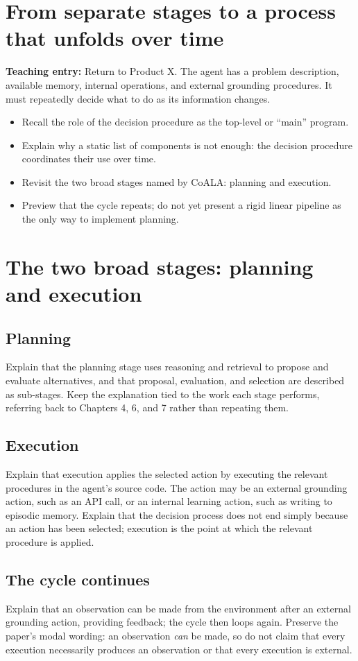 \section{From separate stages to a process that unfolds over time}
\textbf{Teaching entry:} Return to Product X. The agent has a problem description, available memory, internal operations, and external grounding procedures. It must repeatedly decide what to do as its information changes.
\begin{itemize}
  \item Recall the role of the decision procedure as the top-level or ``main'' program.
  \item Explain why a static list of components is not enough: the decision procedure coordinates their use over time.
  \item Revisit the two broad stages named by CoALA: planning and execution.
  \item Preview that the cycle repeats; do not yet present a rigid linear pipeline as the only way to implement planning.
\end{itemize}

\section{The two broad stages: planning and execution}
\subsection{Planning}
Explain that the planning stage uses reasoning and retrieval to propose and evaluate alternatives, and that proposal, evaluation, and selection are described as sub-stages. Keep the explanation tied to the work each stage performs, referring back to Chapters 4, 6, and 7 rather than repeating them.
\subsection{Execution}
Explain that execution applies the selected action by executing the relevant procedures in the agent's source code. The action may be an external grounding action, such as an API call, or an internal learning action, such as writing to episodic memory. Explain that the decision process does not end simply because an action has been selected; execution is the point at which the relevant procedure is applied.
\subsection{The cycle continues}
Explain that an observation can be made from the environment after an external grounding action, providing feedback; the cycle then loops again. Preserve the paper's modal wording: an observation \emph{can} be made, so do not claim that every execution necessarily produces an observation or that every execution is external.

